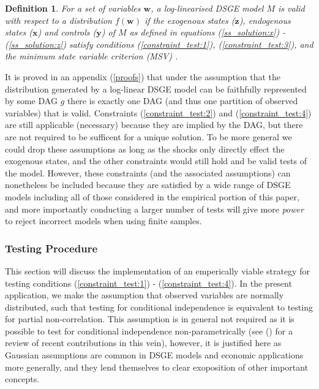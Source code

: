 \documentclass{article}
\newtheorem{definition}{Definition}
\begin{document}
\begin{definition}
  For a set of variables $\mathbf{w}$, a log-linearised DSGE model $M$ is \textit{valid} with respect to a distribution $f(\mathbf{w})$ if the exogenous states ($\mathbf{z}$), endogenous states ($\mathbf{x}$) and controls ($\mathbf{y}$) of $M$ as defined in equations (\ref{ss_solution:x}) - (\ref{ss_solution:z}) satisfy conditions (\ref{constraint_test:1}), (\ref{constraint_test:3}), and the minimum state variable criterion (MSV) \parencite{mccallum1999role}.
  \label{validity}
\end{definition}

It is proved in an appendix (\ref{proofs}) that under the assumption that the distribution generated by a log-linear DSGE model can be faithfully represented by some DAG $g$ there is exactly one DAG (and thus one partition of observed variables) that is valid. Constraints (\ref{constraint_test:2}) and (\ref{constraint_test:4}) are still applicable (necessary) because they are implied by the DAG, but there are not required to be sufficent for a unique solution. To be more general we could drop these assumptions as long as the shocks only directly effect the exogenous states, and the other constraints would still hold and be valid tests of the model. However, these constraints (and the associated assumptions) can nonetheless be included because they are satisfied by a wide range of DSGE models including all of those considered in the empirical portion of this paper, and more importantly conducting a larger number of tests will give more \textit{power} to reject incorrect models when using finite samples.

\subsubsection{Testing Procedure} \label{testing}

This section will discuss the implementation of an emperically viable strategy for testing conditions (\ref{constraint_test:1}) - (\ref{constraint_test:4}). In the present application, we make the assumption that observed variables are normally distributed, such that testing for conditional independence is equivalent to testing for partial non-correlation. This assumption is in general not required as it is possible to test for conditional independence non-parametrically (see \citeauthor{strobl2019approximate} (\citeyear{strobl2019approximate}) for a review of recent contributions in this vein), however, it is justified here as Gaussian assumptions are common in DSGE models and economic applications more generally, and they lend themselves to clear exoposition of other important concepts. 
\end{document}
